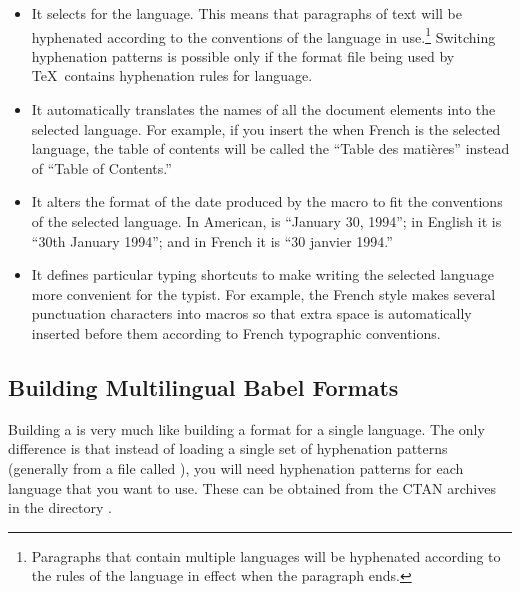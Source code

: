 \begin{itemize}

\item It selects  for 
      the language.   This means
      that paragraphs of text will be hyphenated according to the
      conventions of the language in use.\footnote{Paragraphs that
      contain multiple languages will be hyphenated according to the
      rules of the language in effect when the paragraph ends.}
      Switching hyphenation patterns is possible only if the format
      file being used by \TeX\ contains hyphenation rules for
      language.

\item It automatically translates the names of all the document elements
      into the selected language.  For example, if you insert
      the  when French  is the selected
      language, the table of contents will be called the
      ``Table des mati\`eres'' instead of ``Table of Contents.''

\item It alters the format of the date produced by the  macro
      to fit the conventions of the selected language.
      In American,  is ``January 30, 1994''; in 
      English it is ``30th January 1994''; and in French it is
      ``30 janvier 1994.''

\item It defines particular typing shortcuts to make writing the selected
      language more convenient for the typist.  For example, 
      the French
      style makes several punctuation characters into macros so that extra
      space is automatically inserted before them according to French
      typographic conventions.
\end{itemize}

\subsection{Building Multilingual Babel Formats}
\label{sec:babelfmt}

Building a  is 
very much like building a
format for 
a single language.  The only difference is that instead of loading 
a single set of hyphenation patterns (generally from a file called
), you will need hyphenation patterns for each language 
that you want
to use.  These can be obtained from the CTAN archives in the directory
.

